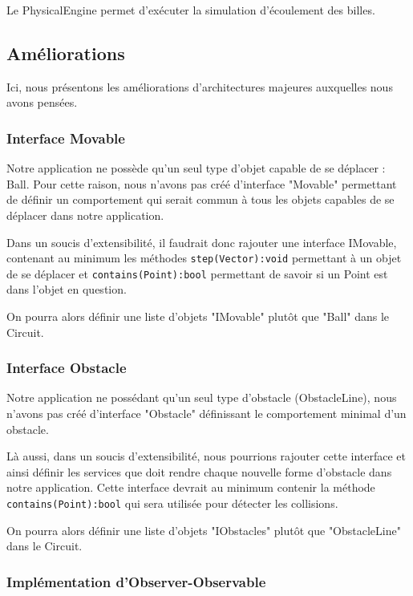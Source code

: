 \documentclass{report}
\begin{document}
Le PhysicalEngine permet d'exécuter la simulation d'écoulement des billes.

\subsection{Améliorations}

Ici, nous présentons les améliorations d'architectures majeures auxquelles nous avons pensées.

\subsubsection{Interface Movable}

Notre application ne possède qu'un seul type d'objet capable de se déplacer : Ball. Pour cette raison, nous n'avons pas créé d'interface "Movable" permettant de définir un comportement qui serait commun à tous les objets capables de se déplacer dans notre application. 

Dans un soucis d'extensibilité, il faudrait donc rajouter une interface IMovable, contenant au minimum les méthodes \texttt{step(Vector):void} permettant à un objet de se déplacer et \texttt{contains(Point):bool} permettant de savoir si un Point est dans l'objet en question.

On pourra alors définir une liste d'objets "IMovable" plutôt que "Ball" dans le Circuit.

\subsubsection{Interface Obstacle}

Notre application ne possédant qu'un seul type d'obstacle (ObstacleLine), nous n'avons pas créé d'interface "Obstacle" définissant le comportement minimal d'un obstacle. 

Là aussi, dans un soucis d'extensibilité, nous pourrions rajouter cette interface et ainsi définir les services que doit rendre chaque nouvelle forme d'obstacle dans notre application. Cette interface devrait au minimum contenir la méthode \texttt{contains(Point):bool} qui sera utilisée pour détecter les collisions.

On pourra alors définir une liste d'objets "IObstacles" plutôt que "ObstacleLine" dans le Circuit.

\subsubsection{Implémentation d'Observer-Observable}
\end{document}
